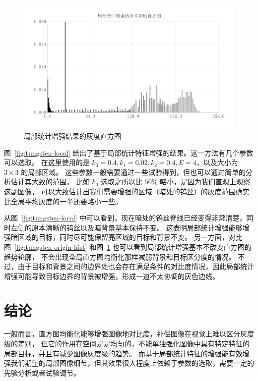 \documentclass{hitgsrep}
\begin{document}
\begin{figure}[!htb]
    \centering
    \includegraphics[width=0.9\linewidth]{tungsten-local-hist.png}
    \caption{局部统计增强结果的灰度直方图}
    \label{fig:tungsten-local-hist}
\end{figure}

图~\ref{fig:tungsten-local} 给出了基于局部统计特征增强的结果。这一方法有几个参数可以选取。
在这里使用的是 $k_0=0.4,k_1=0.02,k_2=0.4,E=4$，以及大小为 $3\times3$ 的局部区域。
这些参数一般需要通过一些试验得到，但也可以通过简单的分析估计其大致的范围。
比如 $k_0$ 选取之所以比 $50\%$ 略小，是因为我们直观上观察这副图像，
可以大致估计出我们需要增强的区域（暗处的钨丝）的灰度范围确实比全局平均灰度的一半还要略小一些。

从图~\ref{fig:tungsten-local} 中可以看到，现在暗处的钨丝脊线已经变得非常清楚，同时左侧的原本清晰的钨丝以及暗背景基本保持不变。
这表明局部统计增强能够增强暗区域的目标，同时尽可能保留亮区域的目标和背景不变。
另一方面，对比图~\ref{fig:tungsten-origin-hist} 和图~\ref{fig:tungsten-local-hist} 也可以看到局部统计增强基本不改变直方图的趋势轮廓，
不会出现全局直方图均衡化那样减弱背景和目标区分度的情况。
不过，由于目标和背景之间的边界处也会存在满足条件的对比度情况，因此局部统计增强可能导致目标边界的背景被增强，形成一道不太协调的灰色边线。

\section{结论}

一般而言，直方图均衡化能够增强图像地对比度，补偿图像在视觉上难以区分灰度级的差别，
但它的作用在空间是是均匀的，不能单独强化图像中具有特定特征的局部目标，并且有减少图像灰度级的趋势。
而基于局部统计特征的增强能有效增强我们期望的局部图像细节，但其效果很大程度上依赖于参数的选取，需要一定的先验分析或者试验调节。

\appendix
\end{document}
